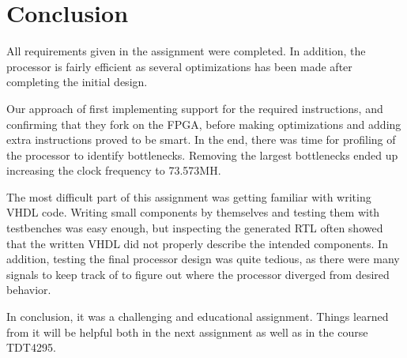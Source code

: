 \section{Conclusion}


All requirements given in the assignment were completed.
In addition, the processor is fairly efficient as several optimizations has been made after completing the initial design.

Our approach of first implementing support for the required instructions, and confirming that they fork on the FPGA, before making optimizations and adding extra instructions proved to be smart.
In the end, there was time for profiling of the processor to identify bottlenecks.
Removing the largest bottlenecks ended up increasing the clock frequency to 73.573MH.

The most difficult part of this assignment was getting familiar with writing VHDL code.
Writing small components by themselves and testing them with testbenches was easy enough,
but inspecting the generated RTL often showed that the written VHDL did not properly describe the intended components.
In addition, testing the final processor design was quite tedious, as there were many signals to keep track of to figure out where the processor diverged from desired behavior.

In conclusion, it was a challenging and educational assignment.
Things learned from it will be helpful both in the next assignment as well as in the course TDT4295.
